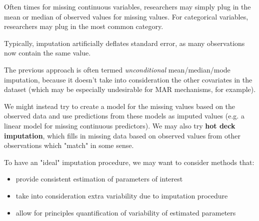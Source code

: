 \documentclass[titlepage, 12pt, leqno]{article}
\begin{document}
Often times for missing continuous variables, researchers may simply plug in the
mean or median of observed values for missing values. For categorical variables,
researchers may plug in the most common category.

\begin{note}
    Typically, imputation artificially deflates standard error, as many
    observations now contain the same value.
\end{note}

The previous approach is often termed \textit{unconditional} mean/median/mode
imputation, because it doesn't take into consideration the other covariates in
the dataset (which may be especially undesirable for MAR mechanisms, for example).

We might instead try to create a model for the missing values based on the
observed data and use predictions from these models as imputed values (e.g. a
linear model for missing continuous predictors). We may also try \textbf{hot
deck imputation}, which fills in missing data based on observed values from 
other observations which "match" in some sense.

To have an "ideal" imputation procedure, we may want to consider methods that:
\begin{itemize}
    \item provide consistent estimation of parameters of interest
    \item take into consideration extra variability due to imputation procedure
    \item allow for principles quantification of variability of estimated
        parameters
\end{itemize}
\end{document}
